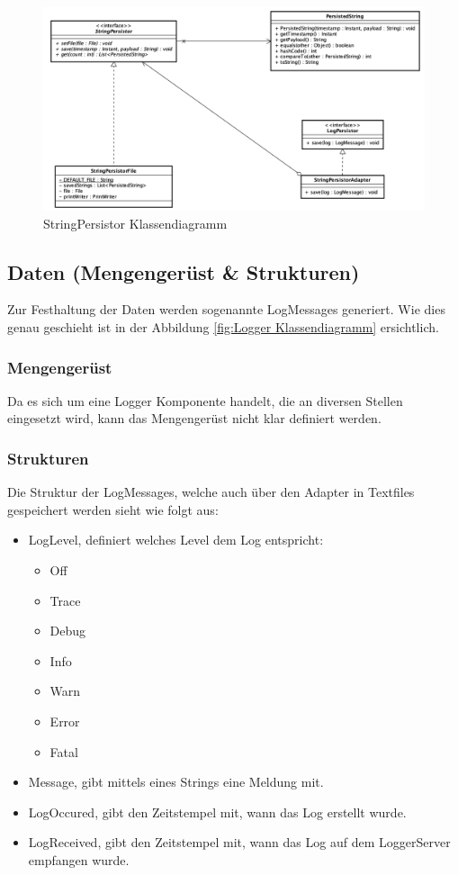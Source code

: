 \begin{figure}[H]
	\centering
	\includegraphics[width=\textwidth]{2_Architektur/Bilder/stringPersistor.png}
	\caption{StringPersistor Klassendiagramm}
	\label{fig:StringPersistor Klassendiagramm}
\end{figure}

\newpage
\subsection{Daten (Mengengerüst \& Strukturen)}
Zur Festhaltung der Daten werden sogenannte LogMessages generiert. Wie dies genau geschieht ist in der Abbildung \ref{fig:Logger Klassendiagramm} ersichtlich.

\subsubsection{Mengengerüst}
Da es sich um eine Logger Komponente handelt, die an diversen Stellen eingesetzt wird, kann das Mengengerüst nicht klar definiert werden.

\subsubsection{Strukturen}
Die Struktur der LogMessages, welche auch über den Adapter in Textfiles gespeichert werden sieht wie folgt aus:
\begin{itemize}
	\item LogLevel, definiert welches Level dem Log entspricht:
	\begin{itemize}
		\item Off
		\item Trace
		\item Debug
		\item Info
		\item Warn
		\item Error
		\item Fatal
	\end{itemize}
	\item Message, gibt mittels eines Strings eine Meldung mit.
	\item LogOccured, gibt den Zeitstempel mit, wann das Log erstellt wurde.
	\item LogReceived, gibt den Zeitstempel mit, wann das Log auf dem LoggerServer empfangen wurde.
\end{itemize}

